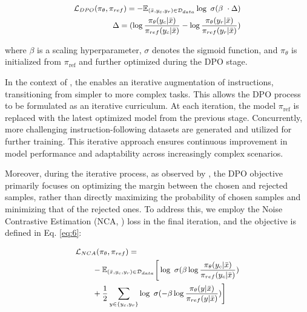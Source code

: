 \begin{equation}
\label{eq:5}
\small
\begin{aligned}
    \mathcal{L}_{DPO}(\pi_\theta, \pi_{ref}) = - \mathbb{E}_{(\bar{x}, y_{c}, y_{r}) \in \mathcal{D}_{data}} \log\ \sigma(\beta\ \cdot \Delta)\\
    \Delta = (\log \frac{\pi_\theta(y_c|\bar{x})}{\pi_{ref}(y_c|\bar{x})} - \log\frac{\pi_\theta(y_r|\bar{x})}{\pi_{ref}(y_r|\bar{x})})
\end{aligned}
\end{equation}

where $\beta$ is a scaling hyperparameter, $\sigma$ denotes the sigmoid function, and $\pi_\theta$ is initialized from $\pi_{\text{ref}}$ and further optimized during the DPO stage.


In the context of \method, the \composer enables an iterative augmentation of instructions, transitioning from simpler to more complex tasks. This allows the DPO process to be formulated as an iterative curriculum. At each iteration, the model $\pi_{\text{ref}}$ is replaced with the latest optimized model from the previous stage. Concurrently, more challenging instruction-following datasets are generated and utilized for further training. This iterative approach ensures continuous improvement in model performance and adaptability across increasingly complex scenarios.

Moreover, during the iterative process, as observed by \citep{chen2024noise}, the DPO objective primarily focuses on optimizing the margin between the chosen and rejected samples, rather than directly maximizing the probability of chosen samples and minimizing that of the rejected ones. To address this, we employ the Noise Contrastive Estimation (NCA, \citet{chen2024noise}) loss in the final iteration, and the objective is defined in Eq. \ref{eq:6}:

\begin{equation}
\label{eq:6}
\small
\begin{aligned}
    \mathcal{L}_{NCA}(\pi_\theta, \pi_{ref}) &= \\
    &\hspace{-1.5cm} - \mathbb{E}_{(\bar{x}, y_{c}, y_{r}) \in \mathcal{D}_{data}}  \bigg[ 
    \log\ \sigma (\beta\log \frac{\pi_\theta(y_c|\bar{x})}{\pi_{ref}(y_c|\bar{x})} ) \\
    &\hspace{-1.5cm}  + \frac{1}{2} \sum_{y \in \{y_c, y_r\}} 
    \log\ \sigma (-\beta\log \frac{\pi_\theta(y|\bar{x})}{\pi_{ref}(y|\bar{x})} ) \bigg]
\end{aligned}
\end{equation}
